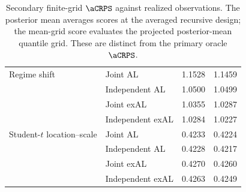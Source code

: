 \begin{table}[p]
\begin{tabular}{@{}>{\raggedright\arraybackslash}p{}>{\raggedright\arraybackslash}p{}rr@{}}
\addlinespace[2pt]
Regime shift & Joint AL & 1.1528 & 1.1459 \\
 & Independent AL & 1.0500 & 1.0499 \\
 & Joint exAL & 1.0355 & 1.0287 \\
 & Independent exAL & 1.0284 & 1.0227 \\
\addlinespace[2pt]
Student-\(t\) location--scale & Joint AL & 0.4233 & 0.4224 \\
 & Independent AL & 0.4228 & 0.4217 \\
 & Joint exAL & 0.4270 & 0.4260 \\
 & Independent exAL & 0.4263 & 0.4249 \\
\bottomrule
\end{tabular}
\caption{Secondary finite-grid \(\aCRPS\) against realized observations. The posterior mean averages scores at the averaged recursive design; the mean-grid score evaluates the projected posterior-mean quantile grid. These are distinct from the primary oracle \(\aCRPS\).}
\label{tab:joint-qdesn-pure-desn-v2-secondary}
\end{table}
